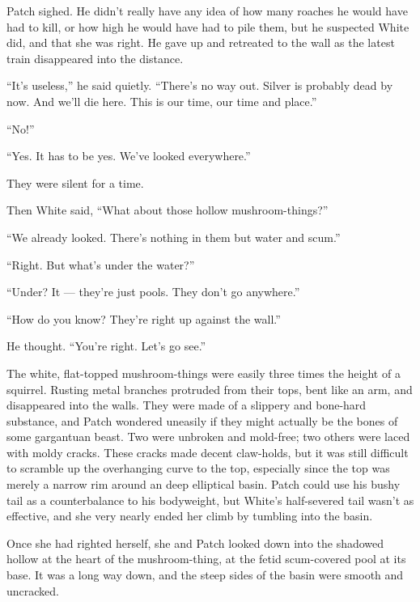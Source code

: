 \documentclass[ebook,oneside,openany,17pt]{memoir}
\newenvironment{tolerant}[1]{%
  \par\tolerance=#1\relax
}{%
  \par
}
\begin{document}
Patch sighed. He didn’t really have any idea of how many roaches he
would have had to kill, or how high he would have had to pile them,
but he suspected White did, and that she was right. He gave up and
retreated to the wall as the latest train disappeared into the
distance.

“It’s useless,” he said quietly. “There’s no way out. Silver is
probably dead by now. And we’ll die here. This is our time, our time
and place.”

“No!”

“Yes. It has to be yes. We’ve looked everywhere.”

They were silent for a time.

Then White said, “What about those hollow mush\-room-things?”

“We already looked. There’s nothing in them but water and scum.”

“Right. But what’s under the water?”

“Under? It — they’re just pools. They don’t go anywhere.”

“How do you know? They’re right up against the wall.”

He thought. “You’re right. Let’s go see.”

\begin{tolerant}{2000}
The white, flat-topped mushroom-things were easily three times the
height of a squirrel. Rusting metal branches protruded from their
tops, bent like an arm, and disappeared into the walls. They were made
of a slippery and bone-hard substance, and Patch wondered uneasily if
they might actually be the bones of some gargantuan beast. Two were
unbroken and mold-free; two others were laced with moldy cracks. These
cracks made decent claw-holds, but it was still difficult to scramble
up the overhanging curve to the top, especially since the top was
merely a narrow rim around an deep elliptical basin. Patch could use
his bushy tail as a counterbalance to his bodyweight, but White’s
half-severed tail wasn’t as effective, and she very nearly ended her
climb by tumbling into the basin.
\end{tolerant}

\begin{tolerant}{500}
Once she had righted herself, she and Patch look\-ed down into the
shadowed hollow at the heart of the mushroom-thing, at the fetid
scum-covered pool at its base. It was a long way down, and the steep
sides of the basin were smooth and uncracked.
\end{tolerant}
\end{document}
